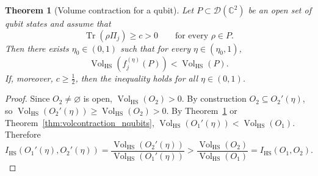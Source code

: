 \documentclass[10pt,a4paper]{amsart}
\newtheorem{theorem}{Theorem}
\begin{document}
\begin{theorem}[Volume contraction for a qubit]
\label{thm:volcontraction_qubit}
Let \(P\subset\mathcal{D}(\mathbb{C}^2)\) be an open set of qubit states and assume that
\[
\operatorname{Tr}(\rho\Pi_j)\ge c>0 \qquad\text{for every }\rho\in P.
\]
Then there exists \(\eta_0\in(0,1)\) such that for every \(\eta\in(\eta_0,1)\),
\[
\operatorname{Vol}_{\mathrm{HS}}(f_j^{(\eta)}(P))<\operatorname{Vol}_{\mathrm{HS}}(P).
\]
If, moreover, \(c\ge\frac12\), then the inequality holds for all \(\eta\in(0,1)\).
\end{theorem}

\begin{proof}
Since $O_2\neq\varnothing$ is open, $\operatorname{Vol}_{\mathrm{HS}}(O_2)>0$. By construction $O_2\subseteq O_2'(\eta)$, so $\operatorname{Vol}_{\mathrm{HS}}(O_2'(\eta))\ge\operatorname{Vol}_{\mathrm{HS}}(O_2)>0$. By Theorem~\ref{thm:volcontraction_qubit} or Theorem~\ref{thm:volcontraction_nqubits}, $\operatorname{Vol}_{\mathrm{HS}}(O_1'(\eta))<\operatorname{Vol}_{\mathrm{HS}}(O_1)$. Therefore
\[
I_{\mathrm{HS}}(O_1'(\eta),O_2'(\eta))
=\frac{\operatorname{Vol}_{\mathrm{HS}}(O_2'(\eta))}{\operatorname{Vol}_{\mathrm{HS}}(O_1'(\eta))}
>\frac{\operatorname{Vol}_{\mathrm{HS}}(O_2)}{\operatorname{Vol}_{\mathrm{HS}}(O_1)}
=I_{\mathrm{HS}}(O_1,O_2).
\]
\end{proof}
\end{document}
